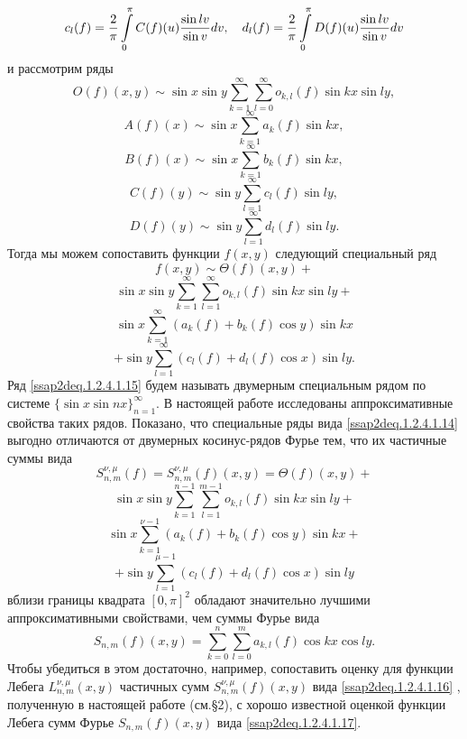 \begin{equation}\label{ssap2deq.1.2.4.1.9}
c_l(f)=\frac2{\pi}\int\limits_0^\pi C(f)(u){\sin lv\over\sin v}dv,\quad
d_l(f)=\frac2{\pi}\int\limits_0^\pi D(f)(u){\sin lv\over\sin v}dv
\end{equation}
и рассмотрим ряды
\begin{equation}\label{ssap2deq.1.2.4.1.10}
O(f)(x,y)\sim \sin x\sin y\sum_{k=1}^\infty\sum_{l=0}^\infty o_{k,l}(f)\sin kx\sin ly,
\end{equation}
\begin{equation}\label{ssap2deq.1.2.4.1.11}
A(f)(x)\sim \sin x\sum_{k=1}^\infty a_{k}(f)\sin kx,
\end{equation}
\begin{equation}\label{ssap2deq.1.2.4.1.12}
B(f)(x)\sim \sin x\sum_{k=1}^\infty b_{k}(f)\sin kx,
\end{equation}
\begin{equation}\label{ssap2deq.1.2.4.1.13}
C(f)(y)\sim \sin y\sum_{l=1}^\infty c_{l}(f)\sin ly,
\end{equation}
\begin{equation}\label{ssap2deq.1.2.4.1.14}
D(f)(y)\sim \sin y\sum_{l=1}^\infty d_{l}(f)\sin ly.
\end{equation}
Тогда  мы можем сопоставить  функции $f(x,y)$ следующий специальный ряд
$$
f(x,y)\sim \Theta(f)(x,y)+
$$
$$
 \sin x\sin y\sum_{k=1}^\infty\sum_{l=1}^\infty o_{k,l}(f)\sin kx\sin ly+
$$
$$
\sin x\sum_{k=1}^\infty (a_{k}(f)+b_{k}(f)\cos y)\sin kx
$$
\begin{equation}\label{ssap2deq.1.2.4.1.15}
 +\sin y\sum_{l=1}^\infty (c_{l}(f)+ d_{l}(f)\cos x)\sin ly.
\end{equation}
Ряд \eqref{ssap2deq.1.2.4.1.15} будем называть двумерным специальным рядом по системе $\{\sin x\sin nx\}_{n=1}^\infty$. В настоящей работе исследованы аппроксимативные свойства таких рядов.  Показано, что специальные ряды вида \eqref{ssap2deq.1.2.4.1.14} выгодно отличаются от двумерных косинус-рядов Фурье тем, что их частичные суммы вида
$$
S_{n,m}^{\nu,\mu}(f)=S_{n,m}^{\nu,\mu}(f)(x,y)= \Theta(f)(x,y)+
$$
$$
 \sin x\sin y\sum_{k=1}^{n-1}\sum_{l=1}^{m-1} o_{k,l}(f)\sin kx\sin ly+
$$
$$
\sin x\sum_{k=1}^{\nu-1} (a_{k}(f)+b_{k}(f)\cos y)\sin kx+
$$
\begin{equation}\label{ssap2deq.1.2.4.1.16}
 +\sin y\sum_{l=1}^{\mu-1} (c_{l}(f)+ d_{l}(f)\cos x)\sin ly
\end{equation}
вблизи границы квадрата $[0,\pi]^2$ обладают значительно лучшими  аппроксимативными свойствами, чем суммы Фурье вида
\begin{equation}\label{ssap2deq.1.2.4.1.17}
S_{n,m}(f)(x,y)=\sum_{k=0}^n\sum_{l=0}^ma_{k,l}(f)\cos kx\cos ly.
\end{equation}
 Чтобы убедиться в этом достаточно, например,  сопоставить  оценку для функции Лебега $L_{n,m}^{\nu,\mu}(x,y)$ частичных сумм  $S_{n,m}^{\nu,\mu}(f)(x,y)$ вида  \eqref{ssap2deq.1.2.4.1.16} , полученную в настоящей работе (см.\S 2), с хорошо известной оценкой функции Лебега сумм Фурье $S_{n,m}(f)(x,y)$ вида \eqref{ssap2deq.1.2.4.1.17}.


